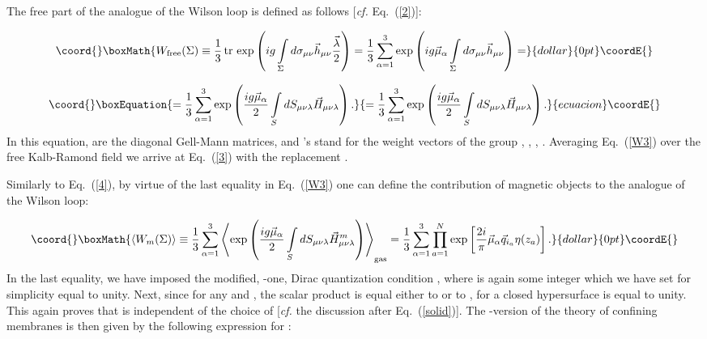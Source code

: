\documentclass[a4paper,12pt]{article}
\begin{document}
The free part of the analogue of the Wilson loop is defined as follows [{\it cf.} Eq.~(\ref{2})]:

$$\coord{}\boxMath{W_{\rm free}(\Sigma)\equiv\frac13{\,}{\rm tr}{\,}\exp\left(ig\int\limits_{\Sigma}^{}d\sigma_{\mu\nu}\vec h_{\mu\nu}\frac{\vec\lambda}{2}\right)=
\frac13\sum\limits_{\alpha=1}^{3}\exp\left(ig\vec\mu_\alpha\int\limits_{\Sigma}^{}d\sigma_{\mu\nu}\vec h_{\mu\nu}\right)=}{dollar}{0pt}\coordE{}$$

\begin{equation}\coord{}\boxEquation{
\label{W3}
=\frac13\sum\limits_{\alpha=1}^{3}\exp\left(\frac{ig\vec\mu_\alpha}{2}
\int\limits_{S}^{} dS_{\mu\nu\lambda}\vec H_{\mu\nu\lambda}\right).
}{
=\frac13\sum\limits_{\alpha=1}^{3}\exp\left(\frac{ig\vec\mu_\alpha}{2}
\int\limits_{S}^{} dS_{\mu\nu\lambda}\vec H_{\mu\nu\lambda}\right).
}{ecuacion}\coordE{}\end{equation}
In this equation, \coordHE{} are the diagonal Gell-Mann matrices, and 
\myHighlight{$\vec\mu_\alpha$}\coordHE{}'s stand for the weight vectors of the group \coordHE{}, 
\coordHE{}, \coordHE{}, \coordHE{}. Averaging Eq.~(\ref{W3}) over the free Kalb-Ramond field \coordHE{} we arrive at Eq.~(\ref{3})
with the replacement \coordHE{}.

Similarly to Eq.~(\ref{4}), by virtue of the last equality in Eq.~(\ref{W3}) one can define the contribution of magnetic objects 
to the analogue of the Wilson loop:

$$\coord{}\boxMath{\left<W_m(\Sigma)\right>\equiv
\frac13\sum\limits_{\alpha=1}^{3}\left<\exp\left(\frac{ig\vec\mu_\alpha}{2}
\int\limits_{S}^{} dS_{\mu\nu\lambda}\vec H_{\mu\nu\lambda}^m\right)\right>_{\rm gas}=
\frac13\sum\limits_{\alpha=1}^{3}\prod\limits_{a=1}^{N}\exp\left[\frac{2i}{\pi}\vec\mu_\alpha\vec q_{i_a}\eta(z_a)\right].}{dollar}{0pt}\coordE{}$$
In the last equality, we have imposed the modified, \coordHE{}-one, Dirac quantization condition \coordHE{}, where \coordHE{} is again some
integer which we have set for simplicity equal to unity. Next, since for any \myHighlight{$\alpha$}\coordHE{} and \coordHE{}, the scalar product \coordHE{}
is equal either to \coordHE{} or to \coordHE{},  
\coordHE{} for a closed hypersurface \coordHE{} is equal to unity. 
This again proves that \coordHE{}
is independent of the choice of \coordHE{} [{\it cf.} the discussion after Eq.~(\ref{solid})].
The \coordHE{}-version of the theory of confining membranes is then given by the following expression for \coordHE{}:
\end{document}
